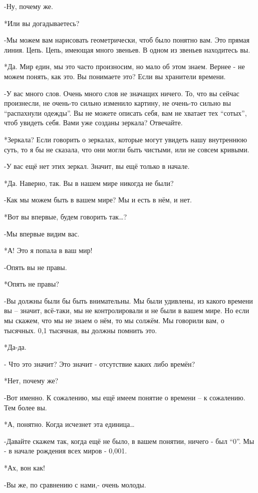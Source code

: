 -Ну, почему же.

*Или вы догадываетесь?

-Мы можем вам нарисовать геометрически, чтоб было понятно вам. Это прямая линия. Цепь. Цепь, имеющая много звеньев. В одном из звеньев находитесь вы.

*Да. Мир един, мы это часто произносим, но мало об этом знаем. Вернее - не можем понять, как это. Вы понимаете это? Если вы хранители времени.

-У вас много слов. Очень много слов не значащих ничего. То, что вы сейчас произнесли, не очень-то  сильно изменило картину, не очень-то сильно вы “распахнули одежды”. Вы не можете описать себя, вам не хватает тех “сотых”, чтоб увидеть себя. Вами уже созданы зеркала? Отвечайте.

*Зеркала? Если говорить о зеркалах, которые могут увидеть нашу внутреннюю суть, то я бы не сказала, что они могли быть чистыми, или не совсем кривыми.

-У вас ещё нет этих зеркал. Значит, вы ещё только в начале.

*Да. Наверно, так. Вы в нашем мире никогда не были?

-Как мы можем быть в вашем мире? Мы и есть в нём, и нет. 

*Вот вы  впервые, будем говорить так…?

-Мы впервые видим вас.

*А!  Это я попала в ваш мир!

-Опять вы не правы. 


*Опять не правы?

-Вы должны были бы быть внимательны. Мы были удивлены, из какого времени вы – значит, всё-таки, мы не контролировали и не были в вашем мире. Но если мы скажем, что мы не знаем о нём,  то мы солжём.  Мы говорили вам, о тысячных. 0,1 тысячная, вы должны помнить это.

*Да-да.

- Что это значит? Это значит - отсутствие каких либо времён?

*Нет, почему же?

-Вот именно. К сожалению, мы ещё имеем понятие о времени – к сожалению.  Тем более вы.

*А, понятно. Когда исчезнет эта единица…

-Давайте скажем так, когда ещё не было, в вашем понятии,  ничего - был “0”. Мы - в начале рождения всех миров  - 0,001. 

*Ах, вон как!

-Вы же, по сравнению с нами,-  очень молоды.

